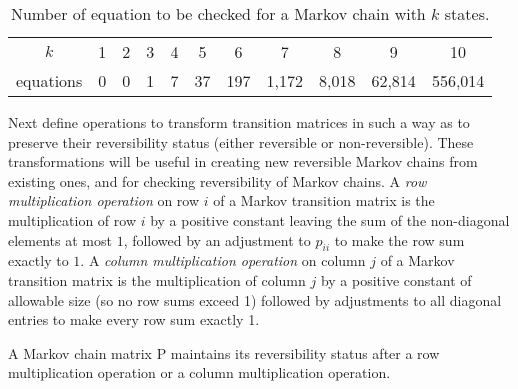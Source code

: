 \documentclass[12pt]{article}
\begin{document}
\begin{table}
    \centering
    \begin{tabular}{ccccccccccc}
        \(k\)       & 1 & 2 & 3 & 4 & 5  & 6   & 7       & 8       & 9        & 10        \\ 
        equations & 0 & 0 & 1 & 7 & 37 & 197 & 1{,}172 & 8{,}018 & 62{,}814 & 556{,}014
    \end{tabular}
    \caption{Number of equation to be checked for a Markov chain with \(
    k \) states.}%
    \label{tab:reversiblemarkovchains:loopeqns}
\end{table}

Next define operations to transform transition matrices in such a way as
to preserve their reversibility status (either reversible or
non-reversible).  These transformations will be useful in creating new
reversible Markov chains from existing ones, and for checking
reversibility of Markov chains.  A \emph{row multiplication operation}
on row \( i \) of a Markov transition matrix is the multiplication of
row \( i \) by a positive constant leaving the sum of the non-diagonal
elements at most \( 1 \), followed by an adjustment to \( p_{ii} \) to
make the row sum exactly to \( 1 \).  A \emph{column multiplication
operation} on column \( j \) of a Markov transition matrix is the
multiplication of column \( j \) by a positive constant of allowable
size (so no row sums exceed 1) followed by adjustments to all diagonal
entries to make every row sum exactly 1.

\begin{lemma}
    A Markov chain matrix P maintains its reversibility status after a
    row multiplication operation or a column multiplication operation.
\end{lemma}
\end{document}
